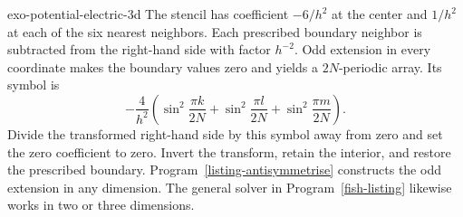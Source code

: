 \begin{correction}{exo-potential-electric-3d}
The stencil has coefficient $-6/h^2$ at the center and $1/h^2$ at each
of the six nearest neighbors. Each prescribed boundary neighbor is subtracted
from the right-hand side with factor $h^{-2}$. Odd extension in every
coordinate makes the boundary values zero and yields a $2N$-periodic array.
Its symbol is
\[
 -\frac4{h^2}\left(\sin^2\frac{\pi k}{2N}
                  +\sin^2\frac{\pi l}{2N}
                  +\sin^2\frac{\pi m}{2N}\right).
\]
Divide the transformed right-hand side by this symbol away from zero and
set the zero coefficient to zero. Invert the transform, retain the interior,
and restore the prescribed boundary. Program~\ref{listing-antisymmetrise}
constructs the odd extension in any dimension. The general solver in
Program~\ref{fish-listing} likewise works in two or three dimensions.
\begin{listing}[H]
\caption{Odd extension along every coordinate axis.}
\label{listing-antisymmetrise}
\end{listing}
\end{correction}

